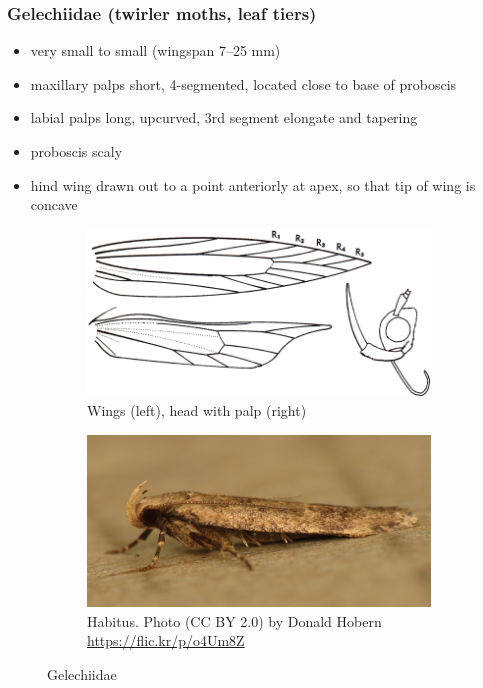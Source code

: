 \documentclass[letterpaper, 11pt]{article}
\begin{document}
\subsubsection{Gelechiidae (twirler moths, leaf tiers)}
\begin{itemize}
\item very small to small (wingspan 7--25 mm)
\item maxillary palps short, 4-segmented, located close to base of proboscis
\item labial palps long, upcurved, 3rd segment elongate and tapering
\item proboscis scaly
\item hind wing drawn out to a point anteriorly at apex, so that tip of wing is concave
\end{itemize}

\begin{figure}[ht!]
    \centering
    \begin{subfigure}[ht!]{0.45\textwidth}
        \includegraphics[width=\textwidth]{image35}
        \caption{Wings (left), head with palp (right)}
        \label{fig:gelechiid1}
    \end{subfigure}
    \qquad %
    \begin{subfigure}[ht!]{0.45\textwidth}
        \includegraphics[width=\textwidth]{gelechiid}
        \caption{Habitus. Photo (CC BY 2.0) by Donald Hobern \url{https://flic.kr/p/o4Um8Z}}
        \label{fig:gelechiid2}
    \end{subfigure}
    \caption{Gelechiidae}\label{fig:gelechiids}
\end{figure}
\end{document}
